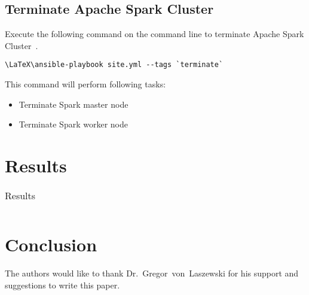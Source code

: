 \subsection{Terminate Apache Spark Cluster}

Execute the following command on the command line to terminate Apache
Spark Cluster~\cite{hid-sp18-511-www-spark}.

\begin{verbatim}
\LaTeX\ansible-playbook site.yml --tags `terminate`
\end{verbatim}

This command will perform following tasks:

\begin{itemize}
	\item Terminate Spark master node
	\item Terminate Spark worker node
\end{itemize}

\section{Results}

\begin{table}[hbt]
	\centering \caption{Results}\label{t:results-table} \begin{tabular}{llll} \end{tabular}
\end{table}


\section{Conclusion}



\begin{acks}

  The authors would like to thank Dr.~Gregor~von~Laszewski for his
  support and suggestions to write this paper.

\end{acks}


 

